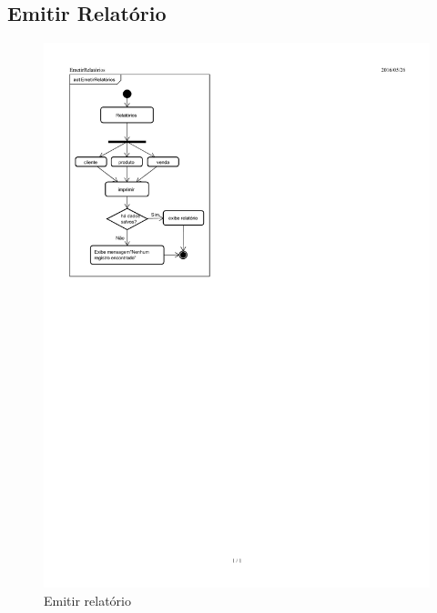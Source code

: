 \documentclass[chapter=TITLE,12pt,oneside,a4paper,english,french,sumario=tradicional,spanish,brazil,]{abntex2}
\begin{document}
\subsection{Emitir Relatório}
\begin{figure}[h]\centering
	\includegraphics[scale=1.8]{emitir-relatorio.pdf}\caption{Emitir relatório}
\end{figure}

\newpage
\end{document}
